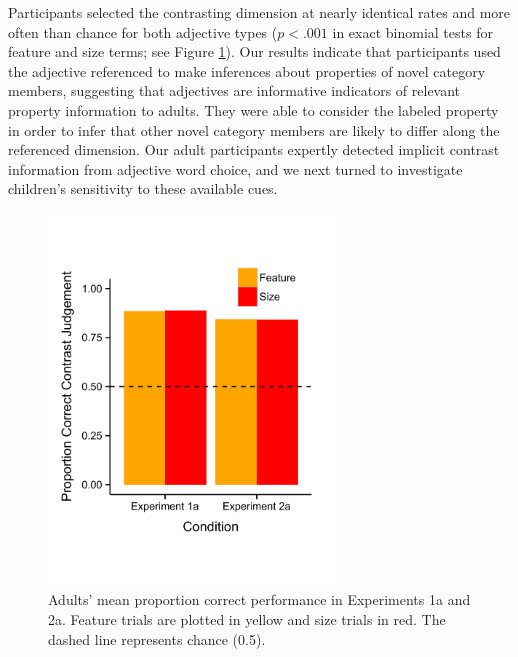 \documentclass[10pt,letterpaper]{article}
\begin{document}
Participants selected the contrasting dimension at nearly identical rates and more often than chance for both adjective types ($p < .001$ in exact binomial tests for feature and size terms; see Figure \ref{fig:adults_plot}).  Our results indicate that participants used the adjective referenced to make inferences about properties of novel category members, suggesting that adjectives are informative indicators of relevant property information to adults.  They were able to consider the labeled property in order to infer that other novel category members are likely to differ along the referenced dimension.  Our adult participants expertly detected implicit contrast information from adjective word choice, and we next turned to investigate children's sensitivity to these available cues.  


	
\begin{figure}[t] 
  \begin{center} 
    \includegraphics[width=3in]{figures/adults2.pdf} 
    \caption{\label{fig:adults_plot} Adults' mean proportion correct performance in Experiments 1a and 2a. Feature trials are plotted in yellow and size trials in red. The dashed line represents chance (0.5). }
  \end{center} 
\end{figure}	
\end{document}

